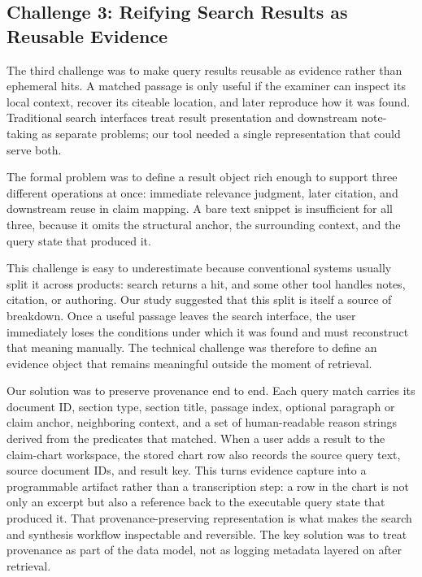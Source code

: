 \documentclass[sigconf]{acmart}
\begin{document}
\subsection{Challenge 3: Reifying Search Results as Reusable Evidence}

The third challenge was to make query results reusable as evidence rather than
ephemeral hits. A matched passage is only useful if the examiner can inspect
its local context, recover its citeable location, and later reproduce how it was
found. Traditional search interfaces treat result presentation and downstream
note-taking as separate problems; our tool needed a single representation that
could serve both.

The formal problem was to define a result object rich enough to support three
different operations at once: immediate relevance judgment, later citation, and
downstream reuse in claim mapping. A bare text snippet is insufficient for all
three, because it omits the structural anchor, the surrounding context, and the
query state that produced it.

This challenge is easy to underestimate because conventional systems usually
split it across products: search returns a hit, and some other tool handles
notes, citation, or authoring. Our study suggested that this split is itself a
source of breakdown. Once a useful passage leaves the search interface, the user
immediately loses the conditions under which it was found and must reconstruct
that meaning manually. The technical challenge was therefore to define an
evidence object that remains meaningful outside the moment of retrieval.

Our solution was to preserve provenance end to end. Each query match carries its
document ID, section type, section title, passage index, optional paragraph or
claim anchor, neighboring context, and a set of human-readable reason strings
derived from the predicates that matched. When a user adds a result to the
claim-chart workspace, the stored chart row also records the source query text,
source document IDs, and result key. This turns evidence capture into a
programmable artifact rather than a transcription step: a row in the chart is
not only an excerpt but also a reference back to the executable query state that
produced it. That provenance-preserving representation is what makes the search
and synthesis workflow inspectable and reversible. The key solution was to
treat provenance as part of the data model, not as logging metadata layered on
after retrieval.
\end{document}

